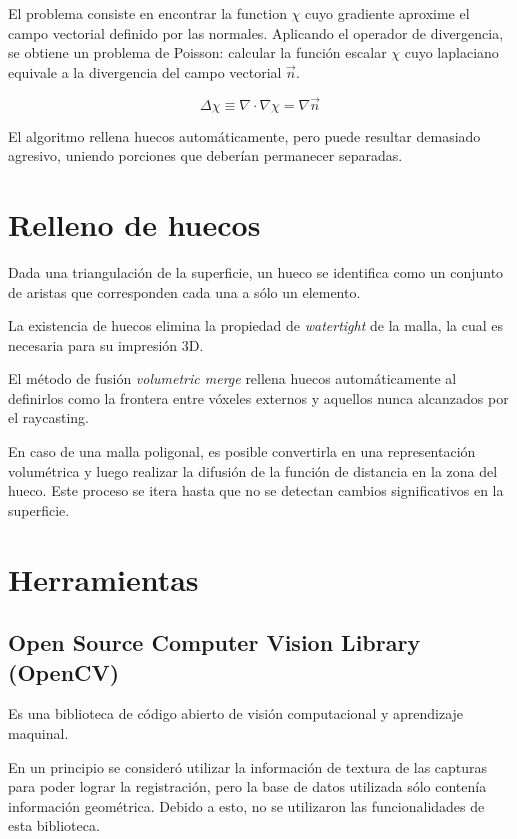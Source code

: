 \documentclass{pfc}
\begin{document}
		El problema consiste en encontrar la function $\chi$ cuyo gradiente
		aproxime el campo vectorial definido por las normales. Aplicando el
		operador de divergencia, se obtiene un problema de Poisson: calcular la
		función escalar $\chi$ cuyo laplaciano equivale a la divergencia del
		campo vectorial $\vec{n}$.

		\[\Delta\chi \equiv \nabla \cdot\nabla\chi = \nabla \vec{n}\]

		El algoritmo rellena huecos automáticamente, pero puede resultar demasiado agresivo, uniendo porciones que deberían permanecer separadas.


	\section{Relleno de huecos}
		Dada una triangulación de la superficie, un hueco se identifica como un conjunto de aristas que corresponden cada una a sólo un elemento.

		La existencia de huecos elimina la propiedad de \emph{watertight} de la
		malla, la cual es necesaria para su impresión 3D.

		El método de fusión \emph{volumetric merge} rellena huecos
		automáticamente al definirlos como la frontera entre vóxeles externos y
		aquellos nunca alcanzados por el raycasting.

		En caso de una malla poligonal, es posible convertirla en una
		representación volumétrica y luego realizar la difusión de la función
		de distancia en la zona del hueco.
		Este proceso se itera hasta que no se detectan cambios significativos en la superficie.


	\section{Herramientas}

		\subsection{Open Source Computer Vision Library (OpenCV)}
			Es una biblioteca de código abierto de
			visión computacional y aprendizaje maquinal.

			En un principio se consideró utilizar la información de textura de
			las capturas para poder lograr la registración, pero la base de
			datos utilizada sólo contenía información geométrica.
			Debido a esto, no se utilizaron las funcionalidades de esta biblioteca.
\end{document}
